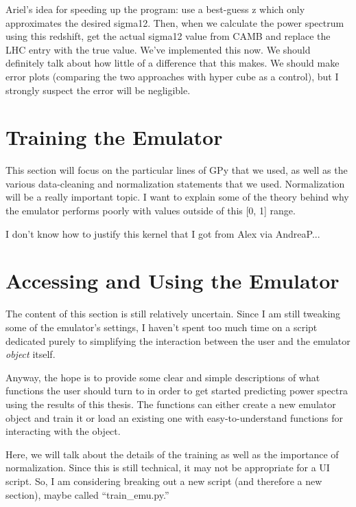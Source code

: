 
Ariel’s idea for speeding up the program: use a best-guess z which only approximates the desired sigma12. Then, when we calculate the power spectrum using this redshift, get the actual sigma12 value from CAMB and replace the LHC entry with the true value.
We’ve implemented this now. We should definitely talk about how little of a difference that this makes. We should make error plots (comparing the two approaches with hyper cube as a control), but I strongly suspect the error will be negligible.


\section{Training the Emulator}
\label{sec: train_emu}


This section will focus on the particular lines of GPy that we used, as well
as the various data-cleaning and normalization statements that we used.
Normalization will be a really important topic. I want to explain some of
the theory behind why the emulator performs poorly with values outside of this
[0, 1] range.

I don't know how to justify this kernel that I got from Alex via AndreaP...

\section{Accessing and Using the Emulator}


The content of this section is still relatively uncertain. Since I am still tweaking some of the emulator's settings, I haven't spent too much time on a script dedicated purely to simplifying the interaction between the user and the emulator \textit{object} itself.

Anyway, the hope is to provide some clear and simple descriptions of what functions the user should turn to in order to get started predicting power spectra using the results of this thesis. The functions can either create a new emulator object and train it or load an existing one with easy-to-understand functions for interacting with the object.

Here, we will talk about the details of the training as well as the importance of normalization. Since this is still technical, it may not be appropriate for a UI script. So, I am considering breaking out a new script (and therefore a new section), maybe called ``train\_emu.py.''
